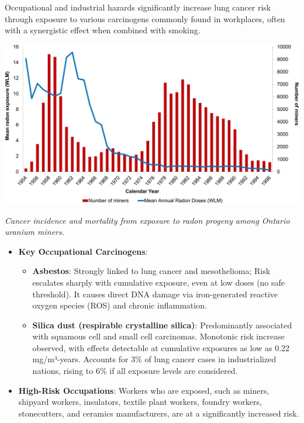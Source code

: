 Occupational and industrial hazards significantly increase lung cancer risk through exposure to 
various carcinogens commonly found in workplaces, often with a synergistic effect when combined 
with smoking.

\includegraphics[width=\textwidth]{../assets/02-etiology/mortality_from_exposure_to_uranium.jpg}
\begin{center} 
    \small\textit{Cancer incidence and mortality from exposure to radon progeny among Ontario uranium 
    miners.\cite{Navaranjan838}}
\end{center} 

\begin{itemize}
    \item \textbf{Key Occupational Carcinogens}: 
    \begin{itemize}
        \item \textbf{Asbestos}: Strongly linked to lung cancer and mesothelioma; Risk escalates 
        sharply with cumulative exposure, even at low doses (no safe threshold). It causes direct 
        DNA damage via iron-generated reactive oxygen species (ROS) and chronic inflammation.
        \cite{9498906}

        \item \textbf{Silica dust (respirable crystalline silica)}: Predominantly associated with 
        squamous cell and small cell carcinomas. Monotonic risk increase observed, with effects 
        detectable at cumulative exposures as low as 0.22 mg/m³-years. Accounts for 3\% of lung 
        cancer cases in industrialized nations, rising to 6\%\cite{CEBP2010} if all exposure levels 
        are considered.
    \end{itemize}

    \item \textbf{High-Risk Occupations}: Workers who are exposed, such as miners, shipyard 
    workers, insulators, textile plant workers, foundry workers, stonecutters, and ceramics 
    manufacturers, are at a significantly increased risk. 
\end{itemize}

